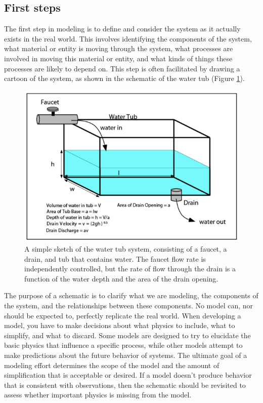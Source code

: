 \documentclass[11pt,letterpaper]{article}
\begin{document}
\subsection{First steps} 
The first step in modeling is to define and consider the system as it actually exists in the real world. This involves identifying the components of the system, what material or entity is moving through the system, what processes are involved in moving this material or entity, and what kinds of things these processes are likely to depend on. This step is often facilitated by drawing a cartoon of the system, as shown in the schematic of the water tub (Figure \ref{fig:schematic}). 
\begin{figure}[h]
\begin{center}
\includegraphics[]{./schematic.pdf}
\caption{A simple sketch of the water tub system, consisting of a faucet, a drain, and tub that contains water. The faucet flow rate is independently controlled, but the rate of flow through the drain is a function of the water depth and the area of the drain opening.}
\label{fig:schematic}
\end{center}
\end{figure}
The purpose of a schematic is to clarify what we are modeling, the components of the system, and the relationships between these components. No model can, nor should be expected to, perfectly replicate the real world. When developing a model, you have to make decisions about what physics to include, what to simplify, and what to discard. Some models are designed to try to elucidate the basic physics that influence a specific process, while other models attempt to make predictions about the future behavior of systems. The ultimate goal of a modeling effort determines the scope of the model and the amount of simplification that is acceptable or desired. If a model doesn't produce behavior that is consistent with observations, then the schematic should be revisited to assess whether important physics is missing from the model.
\end{document}
